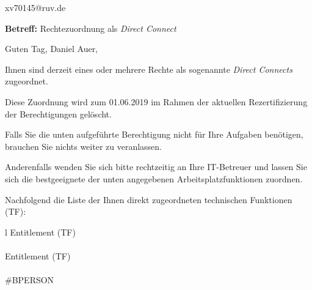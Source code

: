 \documentclass[a4paper,landscape,12pt]{letter}
\begin{document}
\begin{letter}{xv70145@ruv.de\hfill \break}
\begin{normalsize}
	\opening{\textbf{Betreff:} Rechtezuordnung als \emph{Direct Connect}}
	\begin{normalsize} \hfill
	\end{normalsize}

	\begin{normalsize}
		Guten Tag, 
	Daniel Auer, \hfill \break
	\end{normalsize}
	\end{normalsize}
	
\begin{normalsize}
	Ihnen sind derzeit eines oder mehrere Rechte als sogenannte \emph{Direct Connects} zugeordnet.
	
	Diese Zuordnung wird zum 01.06.2019 im Rahmen der aktuellen Rezertifizierung der Berechtigungen gelöscht.
	
	Falls Sie die unten aufgeführte Berechtigung nicht für Ihre Aufgaben benötigen, 
	brauchen Sie nichts weiter zu veranlassen.
	
	Anderenfalls wenden Sie sich bitte rechtzeitig an Ihre IT-Betreuer 
	und lassen Sie sich die bestgeeignete der unten angegebenen Arbeitsplatzfunktionen zuordnen.
	\end{normalsize}
	
\begin{normalsize}
	Nachfolgend die Liste der Ihnen direkt zugeordneten technischen Funktionen (TF):

	\begin{longtable}{l}
		Entitlement (TF) \\ \hline
		\endfirsthead
		\\\hline
		Entitlement (TF) \\ \hline
		\endhead %
		\multicolumn{1}{r@{}}{Fortsetzung \ldots}\\
		\endfoot
		\hline
		\endlastfoot
	\#BPERSON\\
	\end{longtable}
	\end{normalsize}
	

\end{letter}
\end{document}
